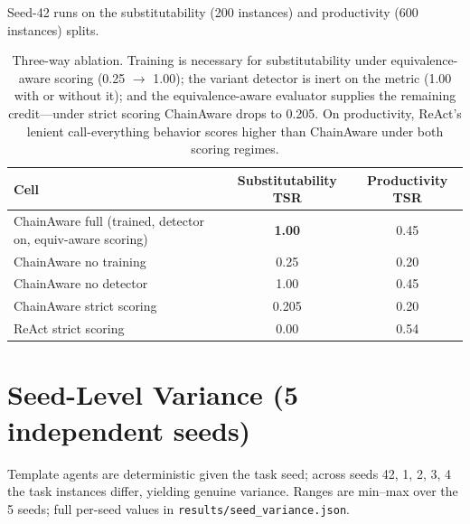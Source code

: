 ﻿\documentclass{article}
\begin{document}
Seed-42 runs on the substitutability (200 instances) and productivity (600 instances) splits.

\begin{table}[h]
\centering
\small
\begin{tabular}{lcc}
\toprule
Cell & Substitutability TSR & Productivity TSR \\
\midrule
ChainAware full (trained, detector on, equiv-aware scoring) & \textbf{1.00} & 0.45 \\
ChainAware no training & 0.25 & 0.20 \\
ChainAware no detector & 1.00 & 0.45 \\
ChainAware strict scoring & 0.205 & 0.20 \\
ReAct strict scoring & 0.00 & 0.54 \\
\bottomrule
\end{tabular}
\caption{Three-way ablation. Training is necessary for substitutability under
equivalence-aware scoring (0.25 $\rightarrow$ 1.00); the variant detector is
inert on the metric (1.00 with or without it); and the equivalence-aware
evaluator supplies the remaining credit---under strict scoring ChainAware
drops to 0.205. On productivity, ReAct's lenient call-everything behavior
scores higher than ChainAware under both scoring regimes.}
\label{tab:ablation_threeway}
\end{table}\section{Seed-Level Variance (5 independent seeds)}

Template agents are deterministic given the task seed; across seeds {42, 1, 2, 3, 4}
the task instances differ, yielding genuine variance. Ranges are min--max over the
5 seeds; full per-seed values in \texttt{results/seed\_variance.json}.
\end{document}
